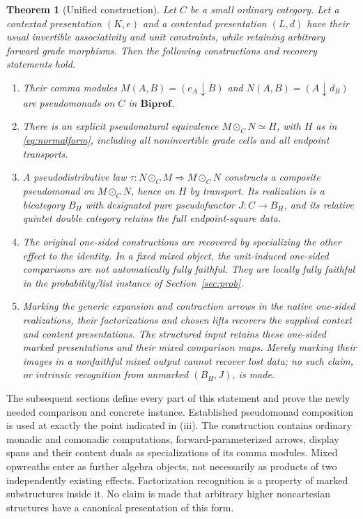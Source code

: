 \documentclass[11pt]{article}
\newtheorem{theorem}{Theorem}[section]
\theoremstyle{definition}
\newcommand{\Biprof}{\mathbf{Biprof}}
\begin{document}
\begin{theorem}[Unified construction]\label{thm:main}
Let $C$ be a small ordinary category. Let a contextad presentation $(K,e)$ and
a contentad presentation $(L,d)$ have their usual invertible associativity
and unit constraints, while retaining arbitrary forward grade morphisms.
Then the following constructions and recovery statements hold.
\begin{enumerate}[label=\textup{(\roman*)}]
\item Their comma modules $M(A,B)=(e_A\downarrow B)$ and
$N(A,B)=(A\downarrow d_B)$ are pseudomonads on $C$ in $\Biprof$.
\item There is an explicit pseudonatural equivalence
$M\odot_C N\simeq H$, with $H$ as in \eqref{eq:normalform}, including all
noninvertible grade cells and all endpoint transports.
\item A pseudodistributive law $\tau:N\odot_C M\Rightarrow M\odot_C N$
constructs a composite pseudomonad on $M\odot_C N$, hence on $H$ by transport.
Its realization is a bicategory $B_H$ with designated pure pseudofunctor
$J:C\to B_H$, and its relative quintet double category retains the full
endpoint-square data.
\item The original one-sided constructions are recovered by specializing
the other effect to the identity. In a fixed mixed object, the unit-induced
one-sided comparisons are not automatically fully faithful. They are locally
fully faithful in the probability/list instance of Section~\ref{sec:prob}.
\item Marking the generic expansion and contraction arrows in the native
one-sided realizations, their factorizations and chosen lifts recovers the
supplied context and content presentations. The structured input retains
these one-sided marked presentations and their mixed comparison maps. Merely
marking their images in a nonfaithful mixed output cannot recover lost data;
no such claim, or intrinsic recognition from unmarked $(B_H,J)$, is made.
\end{enumerate}
\end{theorem}

The subsequent sections define every part of this statement and prove the
newly needed comparison and concrete instance. Established pseudomonad
composition is used at exactly the point indicated in (iii). The construction
contains ordinary monadic and comonadic computations, forward-parameterized
arrows, display spans and their content duals as specializations of its comma
modules. Mixed opwreaths enter as further algebra objects, not necessarily as
products of two independently existing effects. Factorization recognition is
a property of marked substructures inside it. No claim is made that arbitrary
higher noncartesian structures have a canonical presentation of this form.
\end{document}
